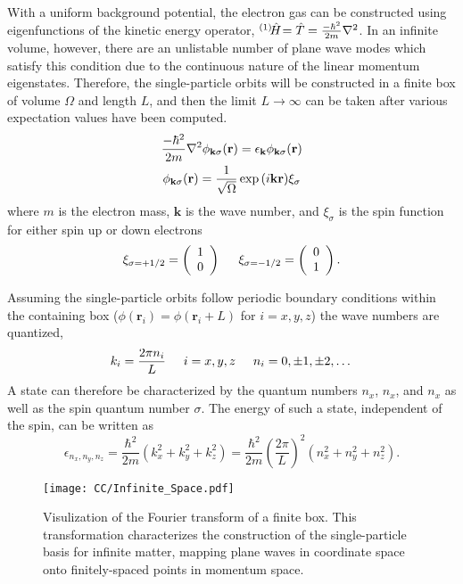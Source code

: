 \documentclass[thesis.tex]{subfiles}
\begin{document}
With a uniform background potential, the electron gas can be constructed using eigenfunctions of the kinetic energy operator, ${}^{\left(1\right)}\hspace{-2pt}\hat{H}\hspace{-2pt} = \hat{T}\hspace{-0.25pt} = \frac{-\hbar^{2}}{2m}\nabla^{2}$.  In an infinite volume, however, there are an unlistable number of plane wave modes which satisfy this condition due to the continuous nature of the linear momentum eigenstates.  Therefore, the single-particle orbits will be constructed in a finite box of volume $\Omega$ and length $L$, and then the limit $L\rightarrow \infty$ can be taken after various expectation values have been computed.
\begin{gather} \label{eq:plane_wave}
  \frac{-\hbar^{2}}{2m}\nabla^{2}\phi_{\mathbf{k}\sigma}(\mathbf{r}) = \epsilon_{\mathbf{k}}\phi_{\mathbf{k}\sigma}(\mathbf{r}) \notag \\
  \phi_{\mathbf{k}\sigma}(\mathbf{r}) = \frac{1}{\sqrt{\Omega}}\exp{(i\mathbf{kr})}\xi_{\sigma}
\end{gather}
where $m$ is the electron mass, $\mathbf{k}$ is the wave number, and $\xi_{\sigma}$ is the spin function for either spin up or down electrons
\begin{equation}
  \xi_{\sigma=+1/2} = \left(\begin{array}{c} 1
    \\ 0 \end{array}\right) \hspace{0.5cm}
  \xi_{\sigma=-1/2} = \left(\begin{array}{c} 0 \\ 1 \end{array}\right).
\end{equation}

Assuming the single-particle orbits follow periodic boundary conditions within the containing box ($\phi(\mathbf{r}_{i}) = \phi(\mathbf{r}_{i} + L)$ for $i = x,y,z$) the wave numbers are quantized,
\begin{equation}
  k_{i} = \frac{2\pi n_{i}}{L}\hspace{0.5cm} i = x,y,z \hspace{0.5cm} n_{i} = 0, \pm 1, \pm 2, \dots
\end{equation}
A state can therefore be characterized by the quantum numbers $n_{x}$, $n_{x}$, and $n_{x}$ as well as the spin quantum number $\sigma$.  The energy of such a state, independent of the spin, can be written as
\begin{equation} \label{eq:infinite_energy}
  \epsilon_{n_{x}, n_{y}, n_{z}} = \frac{\hbar^2}{2m}\left(k_{x}^{2} + k_{y}^{2} + k_{z}^{2}\right) = \frac{\hbar^{2}}{2m}\left(\frac{2\pi }{L}\right)^{2} \left( n_{x}^{2} + n_{y}^{2} + n_{z}^{2}\right).
\end{equation}
\begin{figure}[h]
  \centering
  \texttt{[image: CC/Infinite\_Space.pdf]}
  \caption{Visulization of the Fourier transform of a finite box.  This transformation characterizes the construction of the single-particle basis for infinite matter, mapping plane waves in coordinate space onto finitely-spaced points in momentum space.}
  \label{fig:infinite_space}
\end{figure}
\end{document}
